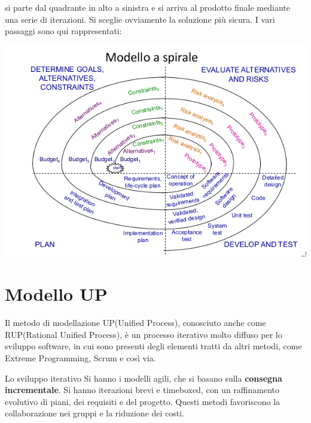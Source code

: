 \documentclass[a4paper,12pt, oneside]{book}
\begin{document}
si parte dal quadrante in alto a sinistra e si arriva al prodotto finale mediante una serie di iterazioni. Si sceglie ovviamente la soluzione più sicura. I vari passaggi sono qui rappresentati:
\begin{center}
	\includegraphics[scale=0.7]{img/ms3.png}
\end{center}
\section{Modello UP}
Il metodo di modellazione UP(Unified Process), conosciuto anche come RUP(Rational Unified Process), è un
processo iterativo molto diffuso per lo sviluppo software, in cui sono presenti degli elementi tratti da 
altri metodi, come Extreme Programming, Scrum e così via.

Lo sviluppo iterativo
Si hanno i modelli agili, che si basano sulla \textbf{consegna incrementale}. Si hanno iterazioni brevi e timeboxed, con un raffinamento evolutivo di piani, dei requisiti e del progetto. Questi metodi favoriscono la collaborazione nei gruppi e la riduzione dei costi.
\end{document}
